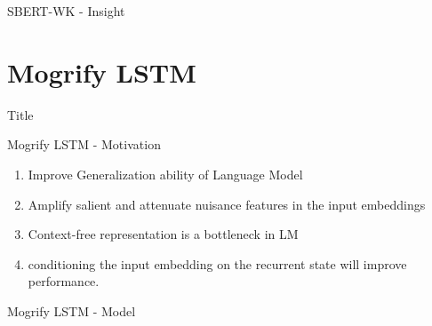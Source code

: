 \documentclass[10pt]{beamer}
\begin{document}
\begin{frame}{SBERT-WK - Insight}

\end{frame}

\section{Mogrify LSTM}

\begin{frame}{Title}

    \begin{figure}
        \centering 
    \end{figure}

\end{frame}

\begin{frame}{Mogrify LSTM - Motivation}
    \begin{enumerate}
        \item Improve Generalization ability of Language Model
        \item Amplify salient and attenuate nuisance features in the input embeddings
        \item Context-free representation is a bottleneck in LM
        \item conditioning the input embedding on the recurrent state will improve performance. 
    \end{enumerate}
\end{frame}

\begin{frame}{Mogrify LSTM - Model}

    \begin{figure}
        \begin{center}
        \end{center}
    \end{figure}

\end{frame}
\end{document}
